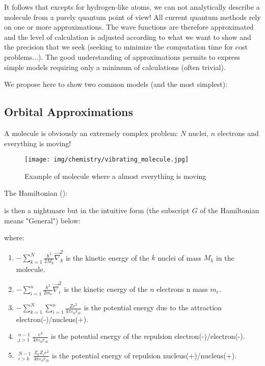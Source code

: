 	It follows that excepts for hydrogen-like atoms, we can not analytically describe a molecule from a purely quantum point of view! All current quantum methods rely on one or more approximations. The wave functions are therefore approximated and the level of calculation is adjusted according to what we want to show and the precision that we seek (seeking to minimize the computation time for cost problems...). The good understanding of approximations permits to express simple models requiring only a minimum of calculations (often trivial).
	
	We propose here to show two common models (and the most simplest):
	
	\subsection{Orbital Approximations}
	A molecule is obviously an extremely complex problem: $N$ nuclei, $n$ electrons and everything is moving!
	\begin{figure}[H]
		\begin{center}
		\texttt{[image: img/chemistry/vibrating\_molecule.jpg]}
		\end{center}	
		\caption{Example of molecule where a almost everything is moving}
	\end{figure}
	The Hamiltonian ():
	
	is then a nightmare but in the intuitive form (the subscript $G$ of the Hamiltonian means "General") below:
	
	where:
	
	\begin{enumerate}
		\item $\displaystyle-\sum_{k=1}^{N}\frac{\hbar^2}{2M_k}\vec{\nabla}_k^2$ is the kinetic energy of the $k$ nuclei of mass $M_k$ in the molecule.

		\item $\displaystyle-\sum_{i=1}^{n}\frac{\hbar^2}{2m_e}\vec{\nabla}_i^2$  is the kinetic energy of the $n$ electrons n mass $m_e$.

		\item $\displaystyle-\sum_{k=1}^{N}\sum_{i=1}^{n}\frac{Ze^2}{4\pi\varepsilon_0 r_{ik}}$ is the potential energy due to the attraction electron(-)/nucleus(+).

		\item $\displaystyle\mathop{\sum_{i=1}}_{j>1}^{n-1}\frac{e^2}{4\pi\varepsilon_0 r_{ik}}$ is the potential energy of the repulsion electron(-)/electron(-).

		\item $\displaystyle\mathop{\sum_{k=1}}_{i>k}^{N-1}\frac{Z_kZ_ie^2}{4\pi\varepsilon_0 r_{ik}}$ is the potential energy of repulsion nucleus(+)/nucleus(+).
	\end{enumerate}

